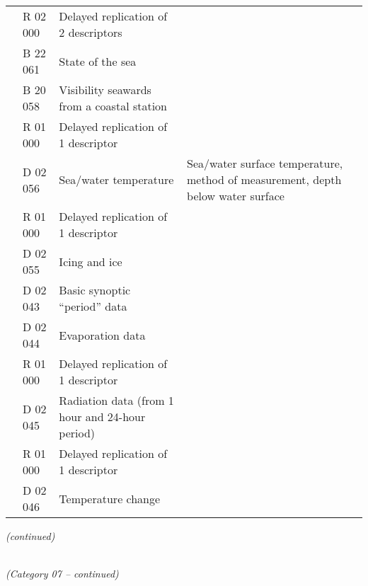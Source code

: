 \begin{longtable}[]{@{}llll@{}}
& R 02 000 & Delayed replication of 2 descriptors &\tabularnewline
& B 22 061 & State of the sea &\tabularnewline
& B 20 058 & Visibility seawards from a coastal station &\tabularnewline
& R 01 000 & Delayed replication of 1 descriptor &\tabularnewline
& D 02 056 & Sea/water temperature & Sea/water surface temperature, method of measurement, depth below water surface\tabularnewline
& R 01 000 & Delayed replication of 1 descriptor &\tabularnewline
& D 02 055 & Icing and ice &\tabularnewline
& D 02 043 & Basic synoptic ``period'' data &\tabularnewline
& D 02 044 & Evaporation data &\tabularnewline
& R 01 000 & Delayed replication of 1 descriptor &\tabularnewline
& D 02 045 & Radiation data (from 1 hour and 24-hour period) &\tabularnewline
& R 01 000 & Delayed replication of 1 descriptor &\tabularnewline
& D 02 046 & Temperature change &\tabularnewline
\bottomrule
\end{longtable}

\emph{(continued)}

\emph{\\
(Category 07 -- continued)}

